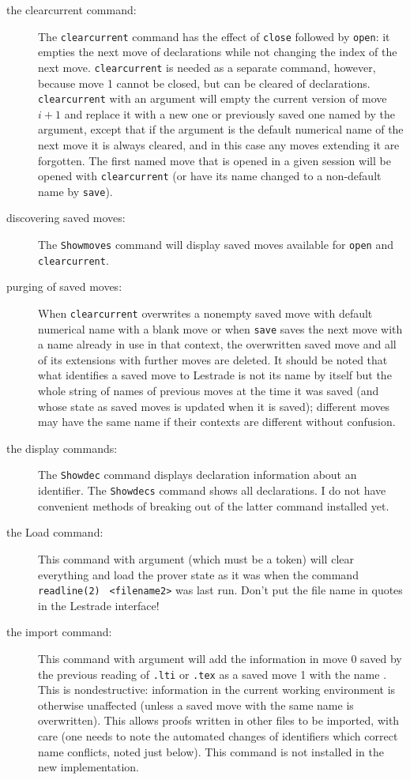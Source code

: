 \documentclass[12pt]{article}
\begin{document}
\begin{description}
\item[the clearcurrent command:]  The {\tt clearcurrent} command has the effect of {\tt close} followed by {\tt open}:  it empties the next move of declarations while not changing the index of the next move.  {\tt clearcurrent} is needed as a separate command, however, because move 1 cannot be closed, but can be cleared of declarations.  {\tt clearcurrent} with an argument will empty the current version of move $i+1$ and replace it with a new one or previously saved one named by the argument, except that if the argument is the default numerical name of the next move it is always cleared, and in this case any moves extending it are forgotten.   The first named move that is opened in a given session will be opened with {\tt clearcurrent} (or have its name changed to a non-default name by {\tt save}).  

\item[discovering saved moves:]   The {\tt Showmoves} command will display saved moves available for {\tt open} and {\tt clearcurrent}.

\item[purging of saved moves:]  When {\tt clearcurrent} overwrites a nonempty saved move with default numerical name with a blank move or when {\tt save}
saves the next move with a name already in use in that context, the overwritten saved move and all of its extensions  with further moves are deleted.    It should be noted that what identifies a saved move to Lestrade is not its name by itself but the whole string of names of previous moves at the time it was saved (and whose state as saved moves is updated when it is saved);  different moves may have the same name if their contexts are different without confusion.

\item[the display commands:]   The {\tt Showdec} command displays declaration information about an identifier.  The {\tt Showdecs} command shows all declarations.  I do not have convenient methods of breaking out of the latter command installed yet.

\item[the Load command:]   This command with argument {\tt <filename1>} (which must be a token) will clear everything and load the prover state as it was when the command
{\tt readline(2)} {\tt <filename1> <filename2>} was last run.  Don't put the file name in quotes in the Lestrade interface! 

\item[the import command:]  This command with argument {\tt <filename1>} will add the information in move 0 saved by the previous reading of {\tt <filename1>.lti} or {\tt <filename1>.tex} as a saved move 1 with the name {\tt <filename1>}.  This is nondestructive:  information in the current working environment is otherwise unaffected (unless a saved move with the same name is overwritten).  This allows proofs written in other files to be imported, with care (one needs to note the automated changes of identifiers which correct name conflicts, noted just below).  This command is not installed in the new implementation.


\end{description}
\end{document}
